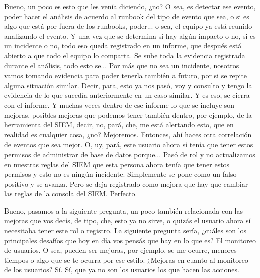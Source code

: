 \begin{description}[leftmargin=0cm, labelsep=0.5cm]
    \item[\textbf{JACUBOVICH LUCIANA:}] Bueno, un poco es esto que les venía diciendo, ¿no? O sea, es detectar ese evento, poder hacer el análisis de acuerdo al runbook del tipo de evento que sea, o si es algo que está por fuera de los runbooks, poder... o sea, el equipo ya está reunido analizando el evento. Y una vez que se determina si hay algún impacto o no, si es un incidente o no, todo eso queda registrado en un informe, que después está abierto a que todo el equipo lo comparta. Se sube toda la evidencia registrada durante el análisis, todo esto se... Por más que no sea un incidente, nosotros vamos tomando evidencia para poder tenerla también a futuro, por si se repite alguna situación similar. Decir, para, esto ya nos pasó, voy y consulto y tengo la evidencia de lo que sucedía anteriormente en un caso similar. Y es eso, se cierra con el informe. Y muchas veces dentro de ese informe lo que se incluye son mejoras, posibles mejoras que podemos tener también dentro, por ejemplo, de la herramienta del SIEM, decir, no, pará, che, me está alertando esto, que en realidad es cualquier cosa, ¿no? Mejoremos. Entonces, ahí haces otra correlación de eventos que sea mejor. O, uy, pará, este usuario ahora sí tenía que tener estos permisos de administrar de base de datos porque... Pasó de rol y no actualizamos en nuestras reglas del SIEM que esta persona ahora tenía que tener estos permisos y esto no es ningún incidente. Simplemente se pone como un falso positivo y se avanza. Pero se deja registrado como mejora que hay que cambiar las reglas de la consola del SIEM. Perfecto.

    \item[\textbf{MUNTAABSKI FEDERICO:}] Bueno, pasamos a la siguiente pregunta, un poco también relacionada con las mejoras que vos decís, de tipo, che, esto ya no sirve, o quizás el usuario ahora sí necesitaba tener este rol o registro. La siguiente pregunta sería, ¿cuáles son los principales desafíos que hoy en día vos pensás que hay en lo que es? El monitoreo de usuarios. O sea, pueden ser mejoras, por ejemplo, se me ocurre, menores tiempos o algo que se te ocurra por ese estilo. ¿Mejoras en cuanto al monitoreo de los usuarios? Sí. Sí, que ya no son los usuarios los que hacen las acciones.


\end{description}
